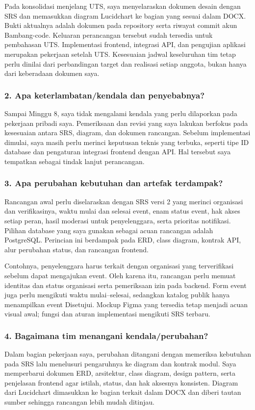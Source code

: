 \documentclass[11pt,a4paper]{article}
\begin{document}
Pada konsolidasi menjelang UTS, saya menyelaraskan dokumen desain dengan SRS dan memasukkan diagram Lucidchart ke bagian yang sesuai dalam DOCX. Bukti aktualnya adalah dokumen pada repository serta riwayat commit akun Bambang-code. Keluaran perancangan tersebut sudah tersedia untuk pembahasan UTS. Implementasi frontend, integrasi API, dan pengujian aplikasi merupakan pekerjaan setelah UTS. Kesesuaian jadwal keseluruhan tim tetap perlu dinilai dari perbandingan target dan realisasi setiap anggota, bukan hanya dari keberadaan dokumen saya.

\subsubsection*{2. Apa keterlambatan/kendala dan penyebabnya?}
Sampai Minggu 8, saya tidak mengalami kendala yang perlu dilaporkan pada pekerjaan pribadi saya. Pemeriksaan dan revisi yang saya lakukan berfokus pada kesesuaian antara SRS, diagram, dan dokumen rancangan. Sebelum implementasi dimulai, saya masih perlu merinci keputusan teknis yang terbuka, seperti tipe ID database dan pengaturan integrasi frontend dengan API. Hal tersebut saya tempatkan sebagai tindak lanjut perancangan.

\subsubsection*{3. Apa perubahan kebutuhan dan artefak terdampak?}
Rancangan awal perlu diselaraskan dengan SRS versi 2 yang merinci organisasi dan verifikasinya, waktu mulai dan selesai event, enam status event, hak akses setiap peran, hasil moderasi untuk penyelenggara, serta prioritas notifikasi. Pilihan database yang saya gunakan sebagai acuan rancangan adalah PostgreSQL. Perincian ini berdampak pada ERD, class diagram, kontrak API, alur perubahan status, dan rancangan frontend.

Contohnya, penyelenggara harus terkait dengan organisasi yang terverifikasi sebelum dapat mengajukan event. Oleh karena itu, rancangan perlu memuat identitas dan status organisasi serta pemeriksaan izin pada backend. Form event juga perlu mengikuti waktu mulai--selesai, sedangkan katalog publik hanya menampilkan event Disetujui. Mockup Figma yang tersedia tetap menjadi acuan visual awal; fungsi dan aturan implementasi mengikuti SRS terbaru.

\subsubsection*{4. Bagaimana tim menangani kendala/perubahan?}
Dalam bagian pekerjaan saya, perubahan ditangani dengan memeriksa kebutuhan pada SRS lalu menelusuri pengaruhnya ke diagram dan kontrak modul. Saya memperbarui dokumen ERD, arsitektur, class diagram, design pattern, serta penjelasan frontend agar istilah, status, dan hak aksesnya konsisten. Diagram dari Lucidchart dimasukkan ke bagian terkait dalam DOCX dan diberi tautan sumber sehingga rancangan lebih mudah ditinjau.
\end{document}

